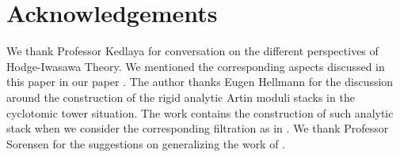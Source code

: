 \documentclass[12pt]{article}
\theoremstyle{definition}
\numberwithin{equation}{section}
\begin{document}
\newpage
\section*{Acknowledgements}
We thank Professor Kedlaya for conversation on the different perspectives  of Hodge-Iwasawa Theory. We mentioned the corresponding aspects discussed in this paper in our paper \cite{T2}. The author thanks Eugen Hellmann for the discussion around the construction of the rigid analytic Artin moduli stacks in the cyclotomic tower situation. The work \cite{EGH} contains the construction of such analytic stack when we consider the corresponding filtration as in \cite{He1}. We thank Professor Sorensen for the suggestions on generalizing the work of \cite{BS}. 
\end{document}

